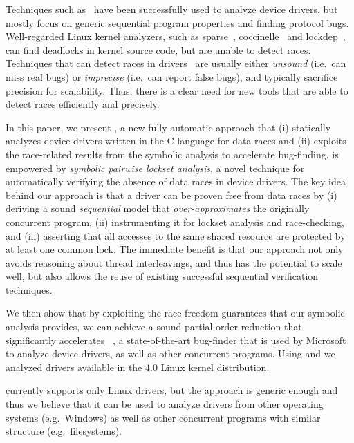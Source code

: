 Techniques such as~\cite{ball2006thorough, clarke2004predicate, engler2000checking, henzinger2002temporal, cook2006termination, kuznetsov2010testing, renzelmann2012symdrive, lal2012corral} have been successfully used to analyze device drivers, but mostly focus on generic sequential program properties and finding protocol bugs. Well-regarded Linux kernel analyzers, such as sparse~\cite{corbet2004sparse}, coccinelle~\cite{padioleau2008doc} and lockdep~\cite{corbet2006lock}, can find deadlocks in kernel source code, but are unable to detect races. Techniques that can detect races in drivers~\cite{qadeer2004kiss, pratikakis2006locksmith, voung2007relay, lal2012corral} are usually either \emph{unsound} (i.e.\ can miss real bugs) or \emph{imprecise} (i.e.\ can report false bugs), and typically sacrifice precision for scalability. Thus, there is a clear need for new tools that are able to detect races efficiently and precisely.

In this paper, we present \whoop, a new fully automatic approach that (i) statically analyzes device drivers written in the C language for data races and (ii) exploits the race-related results from the symbolic analysis to accelerate bug-finding. \whoop is empowered by \emph{symbolic pairwise lockset analysis}, a novel technique for automatically verifying the absence of data races in device drivers. The key idea behind our approach is that a driver can be proven free from data races by (i) deriving a sound \emph{sequential} model that \emph{over-approximates} the originally concurrent program, (ii) instrumenting it for lockset analysis and race-checking, and (iii) asserting that all accesses to the same shared resource are protected by at least one common lock. The immediate benefit is that our approach not only avoids reasoning about thread interleavings, and thus has the potential to scale well, but also allows the reuse of existing successful sequential verification techniques.

We then show that by exploiting the race-freedom guarantees that our symbolic analysis provides, we can achieve a sound partial-order reduction that significantly accelerates \corral~\cite{lal2012corral}, a state-of-the-art bug-finder that is used by Microsoft to analyze device drivers, as well as other concurrent programs. Using \whoop and \corral we analyzed \sizeOfBenchmarks drivers available in the 4.0 Linux kernel distribution.

\whoop currently supports only Linux drivers, but the approach is generic enough and thus we believe that it can be used to analyze drivers from other operating systems (e.g.\ Windows) as well as other concurrent programs with similar structure (e.g.\ filesystems).

